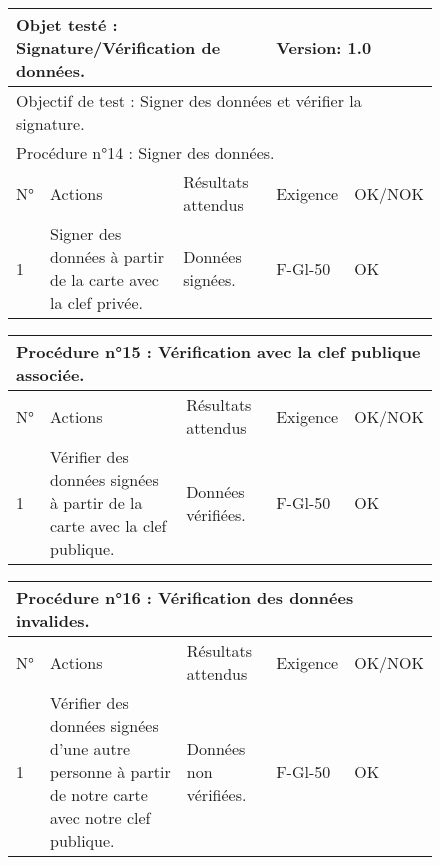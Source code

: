 \documentclass[a4paper,11pt,french]{article}
\begin{document}
\begin{figure}[!h]
\begin{tabular}{|p{1cm}|p{5cm}|p{5cm}|p{2cm}|p{2cm}|}
\hline
\multicolumn{3}{|l|}{Objet testé : Signature/Vérification de données.} & \multicolumn{2}{|l|}{Version: 1.0} \\
\hline
\multicolumn{5}{|l|}{Objectif de test : Signer des données et vérifier la signature.} \\
\hline
\multicolumn{5}{|l|}{Procédure n°14 : Signer des données.} \\
\hline
N° & Actions & Résultats attendus & Exigence & OK/NOK \\
\hline
1 & Signer des données à partir de la carte avec la clef privée. & Données signées. & F-Gl-50 & OK \\
\hline
\end{tabular}
\end{figure}


\begin{figure}[!h]
\begin{tabular}{|p{1cm}|p{5cm}|p{5cm}|p{2cm}|p{2cm}|}
\hline
\multicolumn{5}{|l|}{Procédure n°15 : Vérification avec la clef publique associée.} \\
\hline
N° & Actions & Résultats attendus & Exigence & OK/NOK \\
\hline
1 & Vérifier des données signées à partir de la carte avec la clef publique. & Données vérifiées. & F-Gl-50 & OK \\
\hline
\end{tabular}
\end{figure}


\begin{figure}[!h]
\begin{tabular}{|p{1cm}|p{5cm}|p{5cm}|p{2cm}|p{2cm}|}
\hline
\multicolumn{5}{|l|}{Procédure n°16 : Vérification des données invalides.} \\
\hline
N° & Actions & Résultats attendus & Exigence & OK/NOK \\
\hline
1 & Vérifier des données signées d'une autre personne à partir de notre carte avec notre clef publique. & Données non vérifiées. & F-Gl-50 & OK \\
\hline
\end{tabular}
\end{figure}
\end{document}
